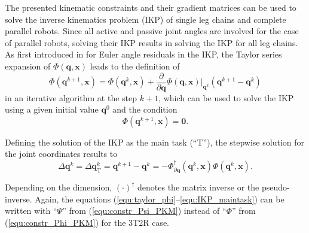 \documentclass[robotics,article,accept,moreauthors,pdftex]{Definitions/mdpi}
\newcommand{\bm}[1]{\boldsymbol{#1}}
\let\Phi\varPhi
\let\Psi\varPsi
\begin{document}
The presented kinematic constraints and their gradient matrices can be used to solve the inverse kinematics problem (IKP) of single leg chains and complete parallel robots.
Since all active and passive joint angles are involved for the case of parallel robots, solving their IKP results in solving the IKP for all leg chains.
As first introduced in \cite{GoldenbergBenFen1985} for Euler angle residuals in the IKP, the Taylor series expansion of $\bm{\Phi}(\bm{q},\bm{x})$ leads to the definition of
%
\begin{equation}
\bm{\Phi}(\bm{q}^{k+1},\bm{x}) = 
\bm{\Phi}(\bm{q}^{k},\bm{x})
+
\frac{\partial}{\partial \bm{q}} \bm{\Phi}(\bm{q},\bm{x}) \biggr\rvert_{\bm{q}^k} (\bm{q}^{k+1} - \bm{q}^k)
\label{equ:taylor_phi}
\end{equation}
%
in an iterative algorithm at the step $k+1$, which can be used to solve the IKP using a given initial value $\bm{q}^{0}$ and the condition
\begin{equation}
\bm{\Phi}(\bm{q}^{k+1},\bm{x})=\bm{0}.
\label{equ:taylor_phi_nextstepzero}
\end{equation}
%

Defining the solution of the IKP as the main task (``T''), the step\deleted[id=Sp]{-}wise solution for the joint coordinates results to
%
\begin{equation}
{\Delta}\bm{q}^{k}
=
{\Delta}\bm{q}_{\mathrm{T}}^k
=
\bm{q}^{k+1} - \bm{q}^k
=
-\bm{\Phi}_{\partial\bm{q}}^{\dagger}(\bm{q}^k,\bm{x}) \bm{\Phi}(\bm{q}^k,\bm{x}).
\label{equ:IKP_maintask}
\end{equation}
%

Depending on the dimension, $(\cdot)^\dagger$ denotes the matrix inverse or the pseudo-inverse.
Again, the equations (\ref{equ:taylor_phi}--\ref{equ:IKP_maintask}) can be written with ``$\bm{\Psi}$'' from (\ref{equ:constr_Psi_PKM}) instead of ``$\bm{\Phi}$'' from (\ref{equ:constr_Phi_PKM}) for the 3T2R case.
\end{document}
